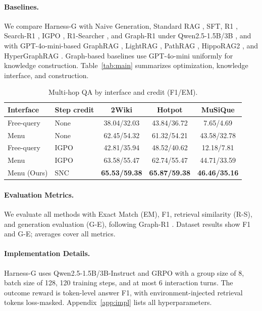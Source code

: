 \documentclass[letterpaper]{article} %
\begin{document}
\paragraph{Baselines.}
We compare Harness-G with Naive Generation, Standard RAG \citep{lewis2020rag}, SFT, R1 \citep{deepseekr1}, Search-R1 \citep{jin2025searchr1}, IGPO \citep{igpo2025}, R1-Searcher \citep{song2025r1searcher}, and Graph-R1 \citep{luo2025graphr1} under Qwen2.5-1.5B/3B \citep{qwen25}, and with GPT-4o-mini-based GraphRAG \citep{edge2024graphrag}, LightRAG \citep{guo2024lightrag}, PathRAG \citep{chen2025pathrag}, HippoRAG2 \citep{gutierrez2025hipporag2}, and HyperGraphRAG \citep{luo2025hypergraphrag}.
Graph-based baselines use GPT-4o-mini uniformly for knowledge construction.
Table~\ref{tab:main} summarizes optimization, knowledge interface, and construction.

\begin{table}[t]
\centering
\small
\setlength{\tabcolsep}{3.5pt}
\renewcommand{\arraystretch}{1.12}
\begin{tabular}{@{}llccc@{}}
\toprule
Interface & Step credit & 2Wiki & Hotpot & MuSiQue \\
\midrule
Free-query & None
& 38.04/32.03
& 43.84/36.72
& 7.65/4.69 \\
Menu & None
& 62.45/54.32
& 61.32/54.21
& 43.58/32.78 \\
Free-query & IGPO
& 42.81/35.94
& 48.52/40.62
& 12.18/7.81 \\
Menu & IGPO
& 63.58/55.47
& 62.74/55.47
& 44.71/33.59 \\
\midrule
Menu (Ours) & SNC
& \textbf{65.53/59.38}
& \textbf{65.87/59.38}
& \textbf{46.46/35.16} \\
\bottomrule
\end{tabular}
\caption{Multi-hop QA by interface and credit (F1/EM).}
\label{tab:interface}
\end{table}

\paragraph{Evaluation Metrics.}
We evaluate all methods with Exact Match (EM), F1, retrieval similarity (R-S), and generation evaluation (G-E), following Graph-R1 \citep{luo2025graphr1}.
Dataset results show F1 and G-E; averages cover all metrics.

\paragraph{Implementation Details.}
Harness-G uses Qwen2.5-1.5B/3B-Instruct \citep{qwen25} and GRPO \citep{shao2024deepseekmath} with a group size of 8, batch size of 128, 120 training steps, and at most 6 interaction turns.
The outcome reward is token-level answer F1, with environment-injected retrieval tokens loss-masked. Appendix~\ref{app:impl} lists all hyperparameters.
\end{document}
